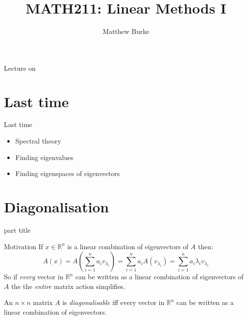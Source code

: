 \documentclass{beamer}
\title{MATH211: Linear Methods I}
\author{Matthew Burke}
\date{\lectureDate}
\newcommand{\lectureDate}{\formatdate{29}{11}{2018}}
\begin{document}
\frame{\titlepage}

\begin{frame}{Lecture on \lectureDate}
  \tableofcontents
\end{frame}

\section*{Last time}
\label{sec:Last-time}

\begin{frame}{Last time}
	\begin{itemize}
		\item Spectral theory\vfill
		\item Finding eigenvalues\vfill
		\item Finding eigenspaces of eigenvectors
	\end{itemize}
\end{frame}

\section{Diagonalisation}

\begin{frame}
\begin{beamercolorbox}[sep=12pt,center]{part title}
\insertsection\par
\end{beamercolorbox}
\end{frame}

\begin{frame}{Motivation}
If $x\in \mathbb{R}^n$ is a linear combination of eigenvectors of $A$ then:
\begin{equation*}
	A(x) = A\left(\sum_{i=1}^n a_i v_{\lambda_i}\right) = \sum_{i=1}^n a_iA(v_{\lambda_i}) = \sum_{i=1}^n a_i\lambda_iv_{\lambda_i}
\end{equation*}
So if \emph{every} vector in $\mathbb{R}^n$ can be written as a linear combination of eigenvectors of $A$ the the \emph{entire} matrix action simplifies.\vfill
\begin{definition}
	An $n\times n$ matrix $A$ is \emph{diagonalisable} iff every vector in $\mathbb{R}^n$ can be written as a linear combination of eigenvectors.
\end{definition}
\end{frame}
\end{document}
